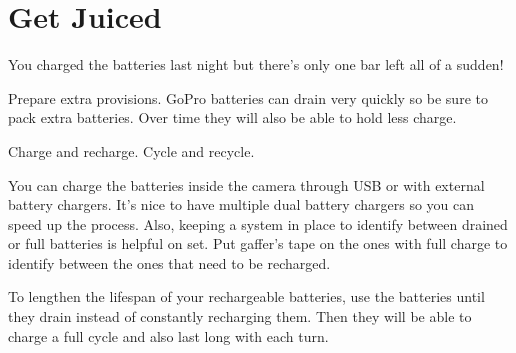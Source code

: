 \chapter{Get Juiced}
\pagecolor{white}
\label{chap:7}
\begin{fullwidth}


\problem

{\large You charged the batteries last night but there’s only one bar left all of a sudden!
 \par}

Prepare extra provisions. GoPro batteries can drain very quickly so be sure to pack extra batteries. Over time they will also be able to hold less charge. 


\solution

{\large Charge and recharge. Cycle and recycle. 
 \par}

You can charge the batteries inside the camera through USB or with external battery chargers. It’s nice to have multiple dual battery chargers so you can speed up the process. Also, keeping a system in place to identify between drained or full batteries is helpful on set. Put gaffer’s tape on the ones with full charge to identify between the ones that need to be recharged. 

To lengthen the lifespan of your rechargeable batteries, use the batteries until they drain instead of constantly recharging them. Then they will be able to charge a full cycle and also last long with each turn. 




\clearpage
\end{fullwidth}
